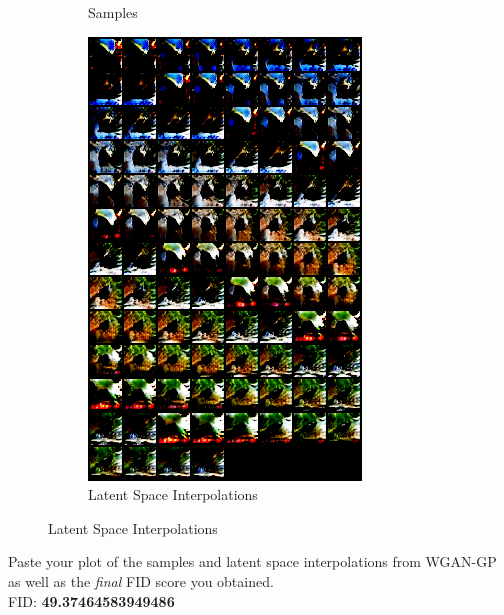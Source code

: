 \documentclass[11pt,addpoints,answers]{exam}
\numberwithin{equation}{section} %
\numberwithin{figure}{section} %
\numberwithin{table}{section} %
\begin{document}
\begin{questions}
\begin{figure}[H]
\begin{subfigure}[b]{0.32\linewidth}
        \caption{Samples}
    \end{subfigure}
    \begin{subfigure}[b]{0.32\linewidth}
        \includegraphics[width=\linewidth]{1.4_interpolations.png}
        \caption{Latent Space Interpolations}
    \end{subfigure}
\end{figure}
\question Paste your plot of the samples and latent space interpolations from WGAN-GP as well as the \textit{final} FID score you obtained. 
\\
FID: \textbf{49.37464583949486} 
\begin{figure}[H]
    \centering

\end{figure}
\end{questions}
\end{document}
